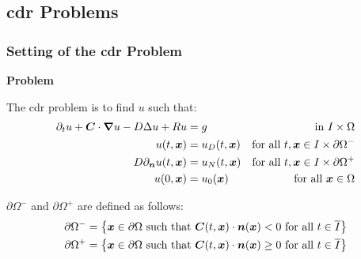 \subsection{\texorpdfstring{\acrlong{cdr}}{} Problems}

\begin{frame}
    \frametitle{Setting of the \acrshort{cdr} Problem}

    \vspace*{\fill}
    \begin{center}
        {\color{\accentcolor} \Large \textbf{Problem}}
        \vspace*{0.25cm}

        \begin{minipage}{0.75\textwidth}
            \begin{definition}
                The \acrshort{cdr} problem is to find $u$ such that:
                \begin{align*}
                    \partial_t u + \bm{C} \cdot \bm{\nabla} u - D \Delta u + R u &= g &\text{ in } I \times \Omega \\ 
                    u(t, \bm{x}) &= u_D(t, \bm{x}) &\text{for all } t, \bm{x} \in I \times \partial \Omega^- \\
                    D \partial_{\bm{n}} u(t, \bm{x}) &= u_N(t, \bm{x}) &\text{for all } t, \bm{x} \in I \times \partial \Omega^+ \\
                    u(0, \bm{x}) &= u_0(\bm{x}) &\text{for all } \bm{x} \in \Omega
                \end{align*}
            \end{definition}
        \end{minipage}
    \end{center}

    \vspace*{\fill}

    \begin{center}
        \begin{minipage}{0.75\textwidth}
            \begin{definition}
                $\partial \Omega^-$ and $\partial \Omega^+$ are defined as follows: 
                \begin{align*}
                    \partial \Omega^- = \left\{ \bm{x} \in \partial \Omega \text{ such that } \bm{C}(t, \bm{x}) \cdot \bm{n}(\bm{x}) < 0 \text{ for all } t \in \overline{I} \right\} \\
                    \partial \Omega^+ = \left\{ \bm{x} \in \partial \Omega \text{ such that } \bm{C}(t, \bm{x}) \cdot \bm{n}(\bm{x}) \geq 0 \text{ for all } t \in \overline{I} \right\}
                \end{align*}
            \end{definition}
        \end{minipage}
    \end{center}
    \vspace*{\fill}
    
\end{frame}


